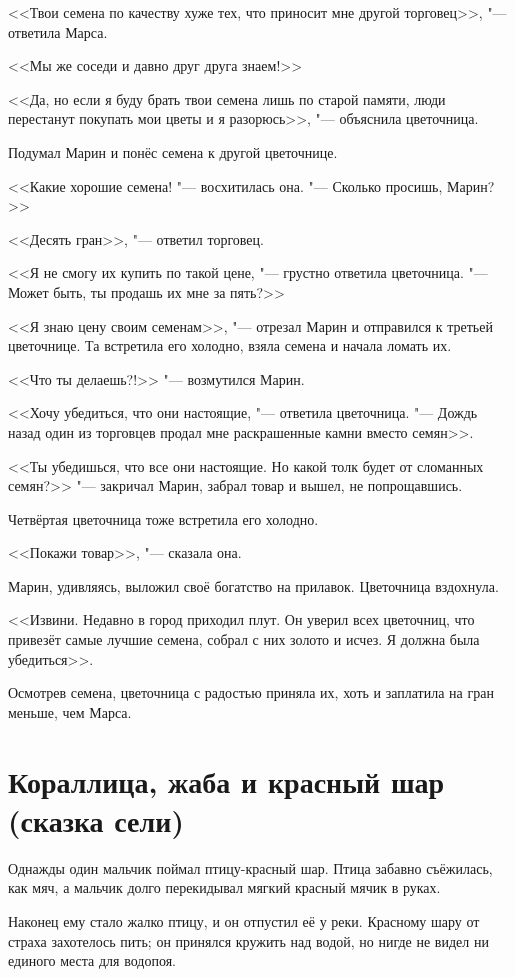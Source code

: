 <<Твои семена по качеству хуже тех, что приносит мне другой торговец>>, "--- ответила Марса.

<<Мы же соседи и давно друг друга знаем!>>

<<Да, но если я буду брать твои семена лишь по старой памяти, люди перестанут покупать мои цветы и я разорюсь>>, "--- объяснила цветочница.

Подумал Марин и понёс семена к другой цветочнице.

<<Какие хорошие семена! "--- восхитилась она.
"--- Сколько просишь, Марин?>>

<<Десять гран>>, "--- ответил торговец.

<<Я не смогу их купить по такой цене, "--- грустно ответила цветочница.
"--- Может быть, ты продашь их мне за пять?>>

<<Я знаю цену своим семенам>>, "--- отрезал Марин и отправился к третьей цветочнице.
Та встретила его холодно, взяла семена и начала ломать их.

<<Что ты делаешь?!>> "--- возмутился Марин.

<<Хочу убедиться, что они настоящие, "--- ответила цветочница.
"--- Дождь назад один из торговцев продал мне раскрашенные камни вместо семян>>.

<<Ты убедишься, что все они настоящие.
Но какой толк будет от сломанных семян?>> "--- закричал Марин, забрал товар и вышел, не попрощавшись.

Четвёртая цветочница тоже встретила его холодно.

<<Покажи товар>>, "--- сказала она.

Марин, удивляясь, выложил своё богатство на прилавок.
Цветочница вздохнула.

<<Извини.
Недавно в город приходил плут.
Он уверил всех цветочниц, что привезёт самые лучшие семена, собрал с них золото и исчез.
Я должна была убедиться>>.

Осмотрев семена, цветочница с радостью приняла их, хоть и заплатила на гран меньше, чем Марса.

\section{Кораллица, жаба и красный шар (сказка сели)}

Однажды один мальчик поймал птицу-красный шар.
Птица забавно съёжилась, как мяч, а мальчик долго перекидывал мягкий красный мячик в руках.

Наконец ему стало жалко птицу, и он отпустил её у реки.
Красному шару от страха захотелось пить;
он принялся кружить над водой, но нигде не видел ни единого места для водопоя.

